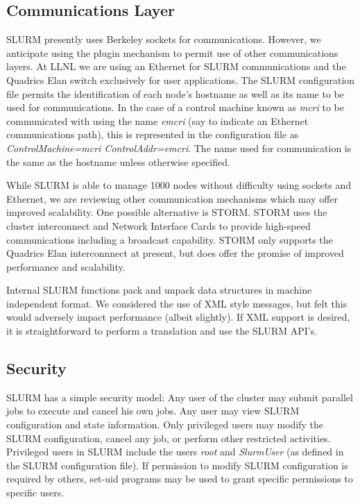 \documentclass[10pt,onecolumn,times]{../common/llncs}
\begin{document}
{\subsection{Communications Layer}

SLURM presently uses Berkeley sockets for communications.  However,
we anticipate using the plugin mechanism to permit use of
other communications layers.  At LLNL we are using an Ethernet
for SLURM communications and the Quadrics Elan switch exclusively
for user applications.  The SLURM configuration file permits the
identification of each node's hostname as well as its name to be used
for communications.  In the case of a control machine known as {\em mcri}
to be communicated with using the name {\em emcri} (say to indicate an
Ethernet communications path), this is represented in the configuration
file as {\em ControlMachine=mcri ControlAddr=emcri}.  The name used for
communication is the same as the hostname unless otherwise specified.

While SLURM is able to manage 1000 nodes without difficulty using
sockets and Ethernet, we are reviewing other communication mechanisms
which may offer improved scalability.  One possible alternative
is STORM\cite{STORM2001}.  STORM uses the cluster interconnect
and Network Interface Cards to provide high-speed communications
including a broadcast capability.  STORM only supports the Quadrics
Elan interconnnect at present, but does offer the promise of improved
performance and scalability.

Internal SLURM functions pack and unpack data structures in machine
independent format. We considered the use of XML style messages, but
felt this would adversely impact performance (albeit slightly).  If XML
support is desired, it is straightforward to perform a translation and
use the SLURM API's.

\subsection{Security}

SLURM has a simple security model: Any user of the cluster may submit
parallel jobs to execute and cancel his own jobs.  Any user may view
SLURM configuration and state information.  Only privileged users
may modify the SLURM configuration, cancel any job, or perform other
restricted activities.  Privileged users in SLURM include the users 
{\em root} and {\em SlurmUser} (as defined in the SLURM configuration file).
If permission to modify SLURM configuration is required by others, set-uid
programs may be used to grant specific permissions to specific users.

}
\end{document}
